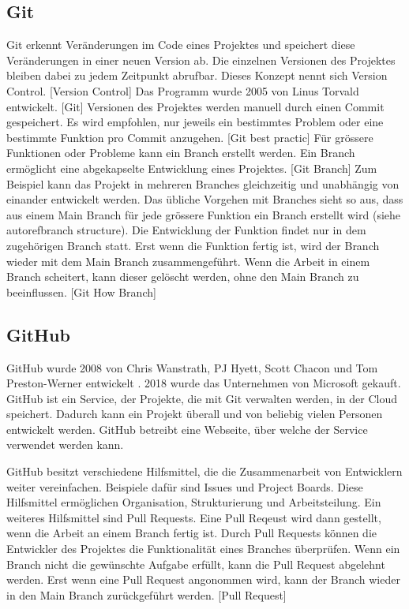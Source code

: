 \subsection{Git}
\label{sub:t_git_git}
Git erkennt Veränderungen im Code eines Projektes und speichert diese
Veränderungen in einer neuen Version ab. Die einzelnen Versionen des Projektes
bleiben dabei zu jedem Zeitpunkt abrufbar. Dieses Konzept nennt sich Version
Control. [Version Control] Das Programm wurde 2005 von Linus Torvald entwickelt.
[Git] Versionen des Projektes werden manuell durch einen Commit gespeichert. Es
wird empfohlen, nur jeweils ein bestimmtes Problem oder eine bestimmte Funktion
pro Commit anzugehen. [Git best practic] Für grössere Funktionen oder Probleme
kann ein Branch erstellt werden. Ein Branch ermöglicht eine abgekapselte
Entwicklung eines Projektes. [Git Branch] Zum Beispiel kann das Projekt in
mehreren Branches gleichzeitig und unabhängig von einander entwickelt werden.
Das übliche Vorgehen mit Branches sieht so aus, dass aus einem Main Branch für
jede grössere Funktion ein Branch erstellt wird (siehe autoref{branch
structure}). Die Entwicklung der Funktion findet nur in dem zugehörigen Branch
statt. Erst wenn die Funktion fertig ist, wird der Branch wieder mit dem Main
Branch zusammengeführt. Wenn die Arbeit in einem Branch scheitert, kann dieser
gelöscht werden, ohne den Main Branch zu beeinflussen. [Git How Branch]


\subsection{GitHub}
\label{sub:t_git_gh}
GitHub wurde 2008 von Chris Wanstrath, PJ Hyett, Scott Chacon und Tom
Preston-Werner entwickelt \cite{noauthor_github_2021}. 2018 wurde das
Unternehmen von Microsoft gekauft. GitHub ist ein Service, der Projekte, die mit
Git verwalten werden, in der Cloud speichert. Dadurch kann ein Projekt überall
und von beliebig vielen Personen entwickelt werden. GitHub betreibt eine
Webseite, über welche der Service verwendet werden kann.
\cite{noauthor_github_2021} 

GitHub besitzt verschiedene Hilfsmittel, die die Zusammenarbeit von Entwicklern
weiter vereinfachen. Beispiele dafür sind Issues und Project Boards. Diese
Hilfsmittel ermöglichen Organisation, Strukturierung und Arbeitsteilung. Ein
weiteres Hilfsmittel sind Pull Requests. Eine Pull Reqeust wird dann gestellt,
wenn die Arbeit an einem Branch fertig ist. Durch Pull Requests können die
Entwickler des Projektes die Funktionalität eines Branches überprüfen. Wenn ein
Branch nicht die gewünschte Aufgabe erfüllt, kann die Pull Request abgelehnt
werden. Erst wenn eine Pull Request angonommen wird, kann der Branch wieder in
den Main Branch zurückgeführt werden. [Pull Request]

